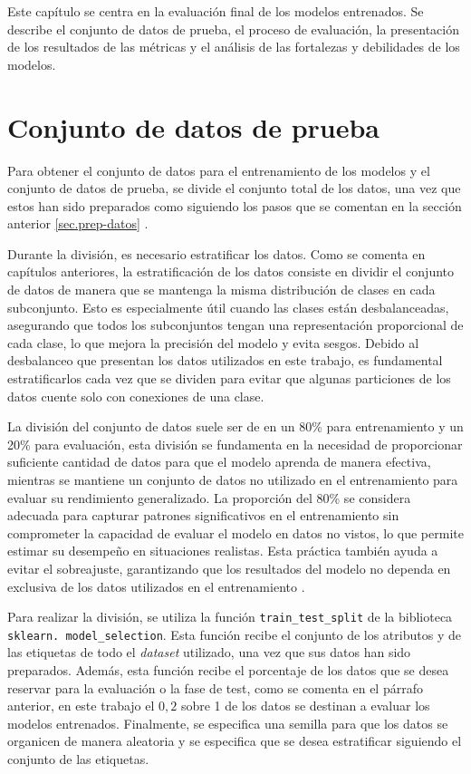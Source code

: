 Este capítulo se centra en la evaluación final de los modelos entrenados. Se describe el conjunto de datos de prueba, el proceso de evaluación, la presentación de los resultados de las métricas y el análisis de las fortalezas y debilidades de los modelos.

\section{Conjunto de datos de prueba}
Para obtener el conjunto de datos para el entrenamiento de los modelos y el conjunto de datos de prueba, se divide el conjunto total de los datos, una vez que estos han sido preparados como siguiendo los pasos que se comentan en la sección anterior \ref{sec.prep-datos} . 

Durante la división, es necesario estratificar los datos. Como se comenta en capítulos anteriores, la estratificación de los datos consiste en dividir el conjunto de datos de manera que se mantenga la misma distribución de clases en cada subconjunto. Esto es especialmente útil cuando las clases están desbalanceadas, asegurando que todos los subconjuntos tengan una representación proporcional de cada clase, lo que mejora la precisión del modelo y evita sesgos. Debido al desbalanceo que presentan los datos utilizados en este trabajo, es fundamental estratificarlos cada vez que se dividen para evitar que algunas particiones de los datos cuente solo con conexiones de una clase.

La división del conjunto de datos suele ser de en un 80\% para entrenamiento y un 20\% para evaluación, esta división se fundamenta en la necesidad de proporcionar suficiente cantidad de datos para que el modelo aprenda de manera efectiva, mientras se mantiene un conjunto de datos no utilizado en el entrenamiento para evaluar su rendimiento generalizado. La proporción del 80\% se considera adecuada para capturar patrones significativos en el entrenamiento sin comprometer la capacidad de evaluar el modelo en datos no vistos, lo que permite estimar su desempeño en situaciones realistas. Esta práctica también ayuda a evitar el sobreajuste, garantizando que los resultados del modelo no dependa en exclusiva de los datos utilizados en el entrenamiento \cite{bishop2006pattern}.

Para realizar la división, se utiliza la función \texttt{train\_test\_split} de la biblioteca \texttt{sklearn. model\_selection}. Esta función recibe el conjunto de los atributos y de las etiquetas de todo el \textit{dataset} utilizado, una vez que sus datos han sido preparados. Además, esta función recibe el porcentaje de los datos que se desea reservar para la evaluación o la fase de test, como se comenta en el párrafo anterior, en este trabajo el $0,2$ sobre 1 de los datos se destinan a evaluar los modelos entrenados. Finalmente, se especifica una semilla para que los datos se organicen de manera aleatoria y se especifica que se desea estratificar siguiendo el conjunto de las etiquetas.

